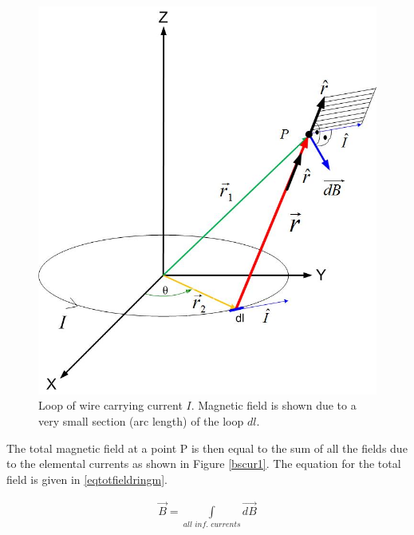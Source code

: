 \documentclass{ximera}
\begin{document}
\begin{figure}[htbp]
\begin{center}
\includegraphics[scale=0.3]{../jpg/magfieldloop.jpg}
\end{center}
\caption{Loop of wire carrying current $I$. Magnetic  field is shown due to a very small section (arc length) of the loop $dl$.}
\label{fig:magfield}
\end{figure}

The total magnetic field at a point P is then equal to the sum of all the fields due to the elemental currents as shown in Figure \ref{bscur1}. The equation for the total field is given in \ref{eqtotfieldringm}. 

\begin{eqnarray}
\vec{B}=\int\limits_{all \,\, inf. \,\, currents} \vec{dB} \label{eqtotfieldringm}
\end{eqnarray}
\end{document}
